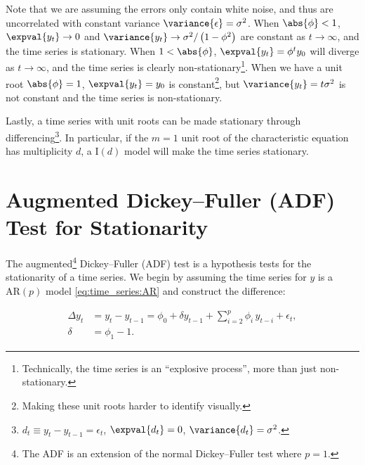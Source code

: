 \noindent Note that we are assuming the errors only contain white noise,
and thus are uncorrelated with constant variance $\variance{\epsilon} = \sigma^{2}$.
When $\abs{\phi} < 1$, $\expval{y_{t}} \to 0$ and
$\variance{y_{t}} \to \sigma^{2}/\left(1-\phi^{2}\right)$ are constant
as $t \to \infty$, and the time series is stationary.
When $1 < \abs{\phi}$, $\expval{y_{t}} = \phi^{t} y_{0}$
will diverge as $t \to \infty$, and the time series is clearly non-stationary\footnote{Technically,
the time series is an ``explosive process'', more than just non-stationary.}.
When we have a unit root $\abs{\phi} = 1$,
$\expval{y_{t}} = y_{0}$ is constant\footnote{Making these unit roots harder to identify visually.},
but $\variance{y_{t}} = t \sigma^{2}$ is not constant and the time series is non-stationary.

Lastly, a time series with unit roots can be made stationary through
differencing\footnote{$d_{t} \equiv y_{t} - y_{t-1} = \epsilon_{t}$, $\expval{d_{t}} = 0$, $\variance{d_{t}} = \sigma^{2}$.}.
In particular, if the $m=1$ unit root of the characteristic equation has multiplicity $d$,
a $\text{I}\left(d\right)$ model will make the time series stationary.

\section{Augmented Dickey--Fuller (ADF) Test for Stationarity}
\label{time_series:ADF}

The augmented\footnote{The ADF is an extension of the normal Dickey--Fuller test where $p = 1$.} Dickey--Fuller (ADF) test
is a hypothesis tests for the stationarity of a time series.
We begin by assuming the time series for $y$ is a $\text{AR}\left(p\right)$ model \cref{eq:time_series:AR}
and construct the difference:

\begin{subequations}\label{eq:time_series:ADF}
\begin{align}
\Delta y_{t} &= y_{t} - y_{t-1} = \phi_{0} + \delta y_{t-1} + \sum_{i=2}^{p} \phi_{i}\, y_{t-i} + \epsilon_{t}, \label{eq:time_series:ADF:Delta_y} \\
\delta &= \phi_{1} - 1. \label{eq:time_series:ADF:delta}
\end{align}
\end{subequations}

